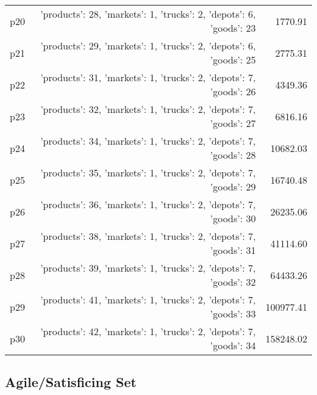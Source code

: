 \documentclass{article}
\begin{document}
\begin{center}
\begin{tabular}{@{}l|r|r@{}}
  p20&{'products': 28, 'markets': 1, 'trucks': 2, 'depots': 6, 'goods': 23}&1770.91\\
  p21&{'products': 29, 'markets': 1, 'trucks': 2, 'depots': 6, 'goods': 25}&2775.31\\
  p22&{'products': 31, 'markets': 1, 'trucks': 2, 'depots': 7, 'goods': 26}&4349.36\\
  p23&{'products': 32, 'markets': 1, 'trucks': 2, 'depots': 7, 'goods': 27}&6816.16\\
  p24&{'products': 34, 'markets': 1, 'trucks': 2, 'depots': 7, 'goods': 28}&10682.03\\
  p25&{'products': 35, 'markets': 1, 'trucks': 2, 'depots': 7, 'goods': 29}&16740.48\\
  p26&{'products': 36, 'markets': 1, 'trucks': 2, 'depots': 7, 'goods': 30}&26235.06\\
  p27&{'products': 38, 'markets': 1, 'trucks': 2, 'depots': 7, 'goods': 31}&41114.60\\
  p28&{'products': 39, 'markets': 1, 'trucks': 2, 'depots': 7, 'goods': 32}&64433.26\\
  p29&{'products': 41, 'markets': 1, 'trucks': 2, 'depots': 7, 'goods': 33}&100977.41\\
  p30&{'products': 42, 'markets': 1, 'trucks': 2, 'depots': 7, 'goods': 34}&158248.02
                            \end{tabular}
                            \end{center}
                    

                                \subsection*{Agile/Satisficing Set}
                                
\end{document}
